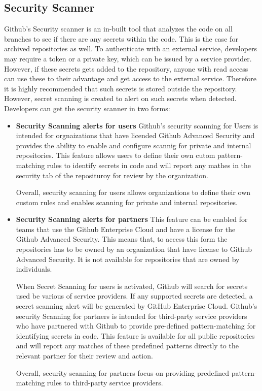 \subsection{Security Scanner}
Github's Security scanner is an in-built tool that analyzes the code on all branches to see if there are any secrets within the code. This is the case for archived repositories as well. To authenticate with an external service, developers may require a token or a private key, which can be issued by a service provider. However, if these secrets gets added to the repository, anyone with read access can use these to their advantage and get access to the external service. Therefore it is highly recommended that such secrets is stored outside the repository. However, secret scanning is created to alert on such secrets when detected. Developers can get the
security scanner in two forms: 
\begin{itemize}
    \item \textbf{Security Scanning alerts for users}
Github's security scanning for Users is intended for orgnaizations that have licended Github Advanced Security and provides the ability to enable and configure scannig for private and internal repositories. This feature allows users to define their own cutom pattern-matching rules to identify secrets in code and will report any mathes in the security tab of the reposituroy for review by the organization. 

Overall, security scanning for users allows organizations to define their own custom rules and enables scanning for private and internal repositories.

\item \textbf{Security Scanning alerts for partners}
This feature can be enabled for teams that use the Github Enterprise Cloud and have a license for the Github Advanced Security. This means that, to access this form the repositories has to be owned by an organization that have license to Github Advanced Security. It is not available for repositories that are owned by individuals. 

When Secret Scanning for users is activated, Github will search for secrets used be various of service providers. If any supported secrets are detected, a secret scanning alert will be generated by GitHub Enterprise Cloud.
Github's security Scanning for partners is intended for  third-party service providers who have partnered with Github to provide pre-defined pattern-matching for identifying secrets in code. This feature is available for all public repositories and will report any matches of these predefined patterns directly to the relevant partner for their review and action. 

Overall, security scanning for partners focus on providing predefined pattern-matching rules to third-party service providers. 
\cite{GithubSecretScanning}
\end{itemize}

